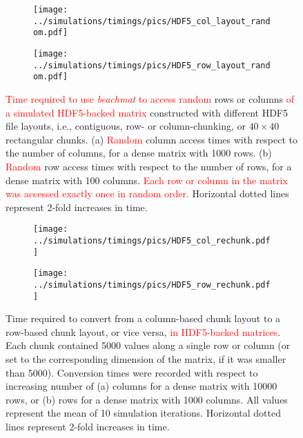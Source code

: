 \documentclass{article}
\newcommand{\beachmat}{\textit{beachmat}}
\newcommand{\revised}[1]{\textcolor{red}{#1}}
\begin{document}
\begin{figure}[bt]
    \begin{subfigure}[b]{0.49\textwidth}
        \texttt{[image: ../simulations/timings/pics/HDF5\_col\_layout\_random.pdf]}
        \caption{}
    \end{subfigure}
    \begin{subfigure}[b]{0.49\textwidth}
        \texttt{[image: ../simulations/timings/pics/HDF5\_row\_layout\_random.pdf]}
        \caption{}
    \end{subfigure}
    \caption{\revised{Time required to use \beachmat{} to access random} rows or columns \revised{of a simulated HDF5-backed matrix} constructed with different HDF5 file layouts, 
        i.e., contiguous, row- or column-chunking, or $40\times40$ rectangular chunks.
        (a) \revised{Random} column access times with respect to the number of columns, for a dense matrix with 1000 rows.
        (b) \revised{Random} row access times with respect to the number of rows, for a dense matrix with 100 columns.
        \revised{Each row or column in the matrix was accessed exactly once in random order.}
        Horizontal dotted lines represent 2-fold increases in time.
    }
    \label{fig:hdf5layoutrandom}
\end{figure}

\begin{figure}[bt]
    \begin{subfigure}[bt]{0.49\textwidth}
        \texttt{[image: ../simulations/timings/pics/HDF5\_col\_rechunk.pdf]}
        \caption{}
    \end{subfigure}
    \begin{subfigure}[bt]{0.49\textwidth}
        \texttt{[image: ../simulations/timings/pics/HDF5\_row\_rechunk.pdf]}
        \caption{}
    \end{subfigure}
    \caption{Time required to convert from a column-based chunk layout to a row-based chunk layout, or vice versa, \revised{in HDF5-backed matrices}.
        Each chunk contained 5000 values along a single row or column (or set to the corresponding dimension of the matrix, if it was smaller than 5000).
        Conversion times were recorded with respect to increasing number of (a) columns for a dense matrix with 10000 rows, or (b) rows for a dense matrix with 1000 columns.
        All values represent the mean of 10 simulation iterations.
        Horizontal dotted lines represent 2-fold increases in time.
    }
    \label{fig:hdf5rechunk}
\end{figure}
\end{document}
